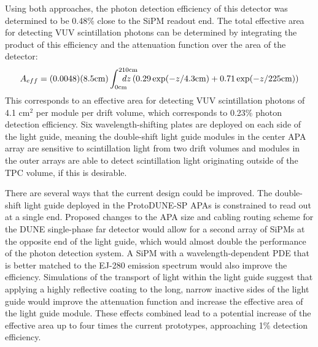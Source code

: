Using both approaches, the photon detection efficiency of this detector was determined to be 0.48\% close to the SiPM readout end. The total effective area for detecting VUV scintillation photons can be determined by integrating the product of this efficiency and the attenuation function over the area of the detector:
\begin{equation*}
  A_{eff} = (0.0048) (8.5\text{cm}) \int_{0\text{cm}}^{210\text{cm}} \hspace{-2em}dz \left( 0.29 \exp(-z/4.3\text{cm}) + 0.71 \exp(-z/225\text{cm}) \right)
\end{equation*}
This corresponds to an effective area for detecting VUV scintillation photons of 4.1 cm$^{2}$ per module per drift volume, which corresponds to 0.23\% photon detection efficiency. 
Six wavelength-shifting plates are deployed on each side of the light guide, meaning the double-shift light guide modules in the center APA array are sensitive to scintillation light from two drift volumes and modules in the outer arrays are able to detect scintillation light originating outside of the TPC volume, if this is desirable.




There are several ways that the current design could be improved. The double-shift light guide deployed in the ProtoDUNE-SP APAs is constrained to read out at a single end. Proposed changes to the APA size and cabling routing scheme for the DUNE single-phase far detector would allow for a second array of SiPMs at the opposite end of the light guide, which would almost double the performance of the photon detection system.
A SiPM with a wavelength-dependent PDE that is better matched to the EJ-280 emission spectrum would also improve the efficiency. Simulations of the transport of light within the light guide suggest that applying a highly reflective coating to the long, narrow inactive sides of the light guide would improve the attenuation function and increase the effective area of the light guide module. These effects combined lead to a potential increase of the effective area up to four times the current prototypes, approaching 1\% detection efficiency.

